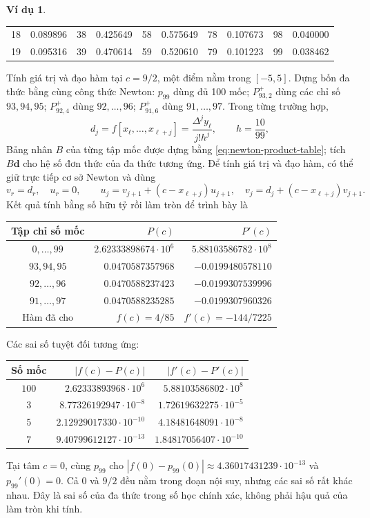 \documentclass[12pt,a4paper,oneside]{book}
\numberwithin{algorithm}{chapter}
\theoremstyle{definition}
\newtheorem{vidu}{Ví dụ}[chapter]
\begin{document}
\begin{vidu}
\begin{center}
\begin{tabular}{rr|rr|rr|rr|rr}
18&0.089896&38&0.425649&58&0.575649&78&0.107673&98&0.040000\\
19&0.095316&39&0.470614&59&0.520610&79&0.101223&99&0.038462\\
\bottomrule\end{tabular}
\end{center}
Tính giá trị và đạo hàm tại $c=9/2$, một điểm nằm trong $[-5,5]$. Dựng bốn đa thức bằng cùng công thức Newton: $p_{99}$ dùng đủ 100 mốc; $P_{93,2}^+$ dùng các chỉ số $93,94,95$; $P_{92,4}^+$ dùng $92,\ldots,96$; $P_{91,6}^+$ dùng $91,\ldots,97$. Trong từng trường hợp,
\[
 d_j=f[x_\ell,\ldots,x_{\ell+j}]
 =\frac{\Delta^jy_\ell}{j!h^j},\qquad h=\frac{10}{99},
\]
Bảng nhân $B$ của từng tập mốc được dựng bằng \eqref{eq:newton-product-table}; tích $B\boldsymbol d$ cho hệ số đơn thức của đa thức tương ứng. Để tính giá trị và đạo hàm, có thể giữ trực tiếp cơ sở Newton và dùng
\[
 v_r=d_r,\quad u_r=0,\qquad
 u_j=v_{j+1}+(c-x_{\ell+j})u_{j+1},\quad
 v_j=d_j+(c-x_{\ell+j})v_{j+1}.
\]
Kết quả tính bằng số hữu tỷ rồi làm tròn để trình bày là
\begin{center}
\small\setlength{\tabcolsep}{4pt}
\begin{tabular}{c|rr}\toprule
Tập chỉ số mốc&$P(c)$&$P'(c)$\\\midrule
$0,\ldots,99$&$2.62333898674\cdot10^6$&$5.88103586782\cdot10^8$\\
$93,94,95$&$0.0470587357968$&$-0.0199480578110$\\
$92,\ldots,96$&$0.0470588237423$&$-0.0199307539996$\\
$91,\ldots,97$&$0.0470588235285$&$-0.0199307960326$\\\midrule
Hàm đã cho&$f(c)=4/85$&$f'(c)=-144/7225$\\\bottomrule
\end{tabular}
\end{center}
Các sai số tuyệt đối tương ứng:
\begin{center}
\small
\begin{tabular}{c|rr}\toprule
Số mốc&$|f(c)-P(c)|$&$|f'(c)-P'(c)|$\\\midrule
$100$&$2.62333893968\cdot10^6$&$5.88103586802\cdot10^8$\\
$3$&$8.77326192947\cdot10^{-8}$&$1.72619632275\cdot10^{-5}$\\
$5$&$2.12929017330\cdot10^{-10}$&$4.18481648091\cdot10^{-8}$\\
$7$&$9.40799612127\cdot10^{-13}$&$1.84817056407\cdot10^{-10}$\\\bottomrule
\end{tabular}
\end{center}
Tại tâm $c=0$, cùng $p_{99}$ cho $|f(0)-p_{99}(0)|\approx4.36017431239\cdot10^{-13}$ và $p_{99}'(0)=0$. Cả $0$ và $9/2$ đều nằm trong đoạn nội suy, nhưng các sai số rất khác nhau. Đây là sai số của đa thức trong số học chính xác, không phải hậu quả của làm tròn khi tính.



\end{vidu}
\end{document}

